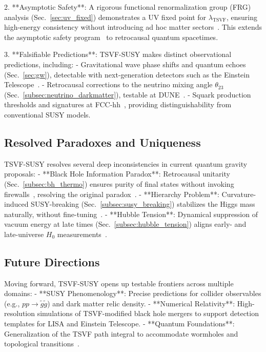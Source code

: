 \documentclass[twocolumn,superscriptaddress,floatfix]{revtex4-2}
\begin{document}
2. **Asymptotic Safety**: A rigorous functional renormalization group (FRG) analysis (Sec.~\ref{sec:uv_fixed}) demonstrates a UV fixed point for $\lambda_{\text{TSVF}}$, ensuring high-energy consistency without introducing ad hoc matter sectors~\cite{Niedermaier2006}. This extends the asymptotic safety program~\cite{Reuter1998} to retrocausal quantum spacetimes.  

3. **Falsifiable Predictions**: TSVF-SUSY makes distinct observational predictions, including:  
   - Gravitational wave phase shifts and quantum echoes (Sec.~\ref{sec:gw}), detectable with next-generation detectors such as the Einstein Telescope~\cite{Punturo2010}.  
   - Retrocausal corrections to the neutrino mixing angle $\theta_{23}$ (Sec.~\ref{subsec:neutrino_darkmatter}), testable at DUNE~\cite{Abi2021}.  
   - Squark production thresholds and signatures at FCC-hh~\cite{Abada2019}, providing distinguishability from conventional SUSY models.  

\subsection{Resolved Paradoxes and Uniqueness}  
TSVF-SUSY resolves several deep inconsistencies in current quantum gravity proposals:  
- **Black Hole Information Paradox**: Retrocausal unitarity (Sec.~\ref{subsec:bh_thermo}) ensures purity of final states without invoking firewalls~\cite{Almheiri2013}, resolving the original paradox~\cite{Hawking1976}.  
- **Hierarchy Problem**: Curvature-induced SUSY-breaking (Sec.~\ref{subsec:susy_breaking}) stabilizes the Higgs mass naturally, without fine-tuning~\cite{Giudice2008}.  
- **Hubble Tension**: Dynamical suppression of vacuum energy at late times (Sec.~\ref{subsec:hubble_tension}) aligns early- and late-universe $H_0$ measurements~\cite{Riess2021}.  

\subsection{Future Directions}  
Moving forward, TSVF-SUSY opens up testable frontiers across multiple domains:  
- **SUSY Phenomenology**: Precise predictions for collider observables (e.g., $pp \to \tilde{g}\tilde{g}$) and dark matter relic density.  
- **Numerical Relativity**: High-resolution simulations of TSVF-modified black hole mergers to support detection templates for LISA and Einstein Telescope.  
- **Quantum Foundations**: Generalization of the TSVF path integral to accommodate wormholes and topological transitions~\cite{Maldacena2020}.  
\end{document}
